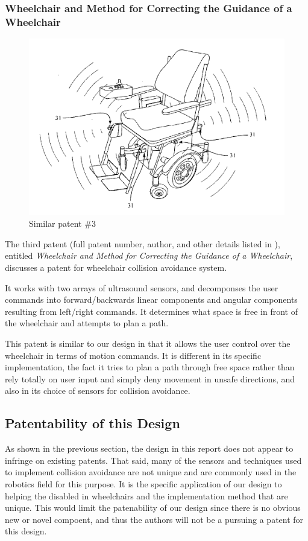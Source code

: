 \documentclass[oneside,final,a4paper]{report}
\begin{document}
\subsubsection{Wheelchair and Method for Correcting the Guidance of a Wheelchair}
\begin{figure}[hbt]
 \centering
 \includegraphics[scale=0.25]{patents2}
 \caption{Similar patent \#3 \cite{patent:wheelchair_method}}
\end{figure}

The third patent (full patent number, author, and other details listed in \cite{patent:wheelchair_method}), entitled \emph{Wheelchair and Method for Correcting the Guidance of a Wheelchair}, discusses a patent for wheelchair collision avoidance system.

It works with two arrays of ultrasound sensors, and decomponses the user commands into forward/backwards linear components and angular components resulting from left/right commands. It determines what space is free in front of the wheelchair and attempts to plan a path.

This patent is similar to our design in that it allows the user control over the wheelchair in terms of motion commands. It is different in its specific implementation, the fact it tries to plan a path through free space rather than rely totally on user input and simply deny movement in unsafe directions, and also in its choice of sensors for collision avoidance.

\subsection{Patentability of this Design}
As shown in the previous section, the design in this report does not appear to infringe on existing patents. That said, many of the sensors and techniques used to implement collision avoidance are not unique and are commonly used in the robotics field for this purpose. It is the specific application of our design to helping the disabled in wheelchairs and the implementation method that are unique. This would limit the patenability of our design since there is no obvious new or novel compoent, and thus the authors will not be a pursuing a patent for this design.
\end{document}
